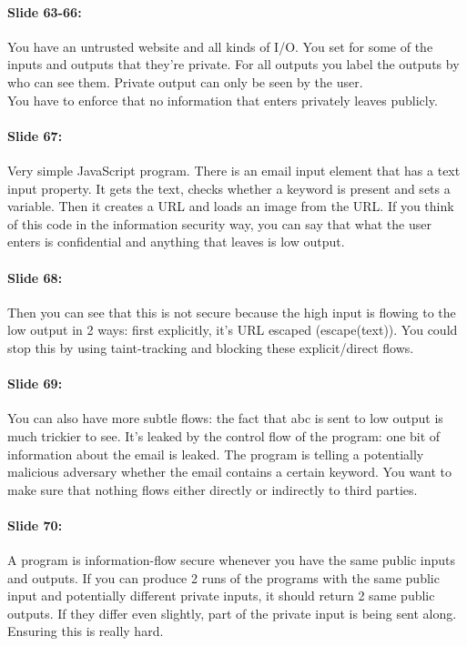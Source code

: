 \documentclass[10pt,a4paper]{report}
\begin{document}
\paragraph{Slide 63-66:} You have an untrusted website and all kinds of I/O. You set for some of the inputs and outputs that they're private. For all outputs you label the outputs by who can see them. Private output can only be seen by the user. \\
You have to enforce that no information that enters privately leaves publicly. 

\paragraph{Slide 67:} Very simple JavaScript program. There is an email input element that has a text input property. It gets the text, checks whether a keyword is present and sets a variable. Then it creates a URL and loads an image from the URL. If you think of this code in the information security way, you can say that what the user enters is confidential and anything that leaves is low output.

\paragraph{Slide 68:} Then you can see that this is not secure because the high input is flowing to the low output in 2 ways: first explicitly, it's URL escaped (escape(text)). You could stop this by using taint-tracking and blocking these explicit/direct flows.

\paragraph{Slide 69:} You can also have more subtle flows: the fact that abc is sent to low output is much trickier to see. It's leaked by the control flow of the program: one bit of information about the email is leaked. The program is telling a potentially malicious adversary whether the email contains a certain keyword. You want to make sure that nothing flows either directly or indirectly to third parties.

\paragraph{Slide 70:} A program is information-flow secure whenever you have the same public inputs and outputs. If you can produce 2 runs of the programs with the same public input and potentially different private inputs, it should return 2 same public outputs. If they differ even slightly, part of the private input is being sent along.\\
Ensuring this is really hard. 
\end{document}
